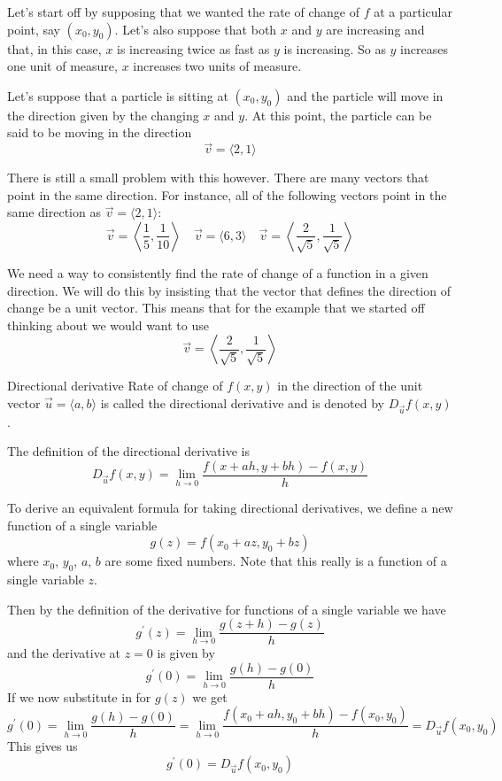 Let's start off by supposing that we wanted the rate of change of $f$ at a particular point, say $(x_0,y_0)$. Let's also suppose that both $x$ and $y$ are increasing and that, in this case, $x$ is increasing twice as fast as $y$ is increasing. So as $y$ increases one unit of measure, $x$ increases two units of measure.

Let's suppose that a particle is sitting at $(x_0,y_0)$ and the particle will move in the direction given by the changing 
$x$ and $y$. At this point, the particle can be said to be moving in the direction
\[ \vec{v} = \langle {2,1} \rangle \]

There is still a small problem with this however. There are many vectors that point in the same direction. For instance, all of the following vectors point in the same direction as $\vec v = \langle {2,1} \rangle$:
\[ \vec{v} = \left\langle {\frac{1}{5},\frac{1}{10}}\right\rangle \quad \vec{v} = \langle {6,3}\rangle \quad \vec{v} = \left\langle {\frac{2}{\sqrt{5}},\frac{1}{\sqrt{5}}}\right\rangle \]

We need a way to consistently find the rate of change of a function in a given direction. We will do this by insisting that the vector that defines the direction of change be a unit vector. This means that for the example that we started off thinking about we would want to use
\[ \vec{v} = \left\langle {\frac{2}{\sqrt{5}},\frac{1}{\sqrt{5}}}\right\rangle \]

\begin{defn}{Directional derivative}{}
Rate of change of $f(x,y)$ in the direction of the unit vector $\vec{u}=\langle{a,b}\rangle$ is called the directional derivative and is denoted by $D_{\vec{u}} f(x,y)$.

The definition of the directional derivative is
\begin{equation}
{D_{\vec u}}f(x,y) = \lim_{h\to0} \frac{f(x + ah,y + bh) - f(x,y)}{h}
\end{equation}
\end{defn}

To derive an equivalent formula for taking directional derivatives, we define a new function of a single variable
\[ g(z) = f(x_0+az,y_0+bz) \]
where $x_0$, $y_0$, $a$, $b$ are some fixed numbers. Note that this really is a function of a single variable $z$.

Then by the definition of the derivative for functions of a single variable we have
\[ g^\prime(z) = \lim_{h\to0} \frac{g(z+h)-g(z)}{h} \]
and the derivative at $z=0$ is given by
\[ g^\prime(0) = \lim_{h\to0} \frac{g(h)-g(0)}{h} \]
If we now substitute in for $g(z)$ we get
\[ g^\prime(0) = \lim_{h\to0} \frac{g(h)-g(0)}{h} = \lim_{h\to0} \frac{f(x_0+ah,y_0+bh) - f(x_0,y_0)}{h} = D_{\vec u}f(x_0,y_0) \]
This gives us
\begin{equation}\tag{1}
g^\prime(0) = D_{\vec u}f(x_0,y_0)
\end{equation}

